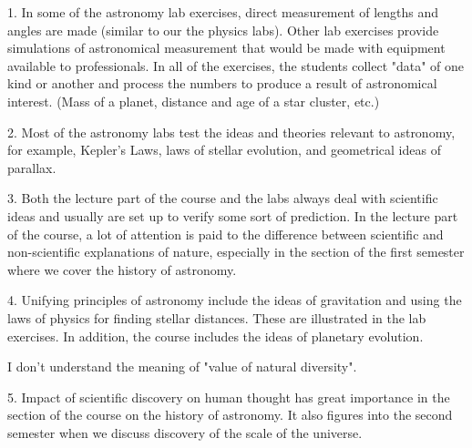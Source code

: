 1.  In some of the astronomy lab exercises, direct measurement of lengths and
angles are made (similar to our the physics labs).  Other lab exercises provide
simulations of astronomical measurement that would be made with equipment
available to professionals.  In all of the exercises, the students collect
"data" of one kind or another and process the numbers to produce a result of
astronomical interest.  (Mass of a planet, distance and age of a star cluster,
etc.)

2. Most of the astronomy labs test the ideas and theories relevant to
astronomy, for example, Kepler's Laws, laws of stellar evolution, and
geometrical ideas of parallax.

3. Both the lecture part of the course and the labs always deal with scientific
ideas and usually are set up to verify some sort of prediction.  In the lecture
part of the course, a lot of attention is paid to the difference between
scientific and non-scientific explanations of nature, especially in the section
of the first semester where we cover the history of astronomy.

4.  Unifying principles of astronomy include the ideas of gravitation and using
the laws of physics for finding stellar distances.  These are illustrated in
the lab exercises.  In addition, the course includes the ideas of planetary
evolution.

I don't understand the meaning of "value of natural diversity".

5. Impact of scientific discovery on human thought has great importance in the
section of the course on the history of astronomy.  It also figures into the
second semester when we discuss discovery of the scale of the universe.
